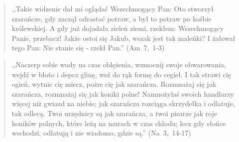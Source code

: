 \documentclass[10pt,a4paper,oneside]{article}
\begin{document}
\begin{quote}
,,Takie widzenie dał mi oglądać Wszechmogący Pan: Oto stworzył szarańcze, gdy zaczął odrastać potraw, a był to potraw po kośbie królewskiej. A gdy już dojadała zieleń ziemi, rzekłem: Wszechmogący Panie, przebacz! Jakże ostoi się Jakub, wszak jest tak maleńki? I żałował tego Pan: Nie stanie się - rzekł Pan.'' (Am~7,~1-3)
\end{quote}
\begin{quote}
,,Naczerp sobie wody na czas oblężenia, wzmocnij swoje obwarowania, wejdź w błoto i depcz glinę, weź do rąk formę do cegieł. I tak strawi cię ogień, wytnie cię miecz, pożre cię jak szarańcza. Rozmnażaj się jak szarańcza, rozmnażaj się jak koniki polne! Namnożyłaś swoich handlarzy więcej niż gwiazd na niebie; jak szarańcza rozciąga skrzydełka i odlatuje, tak odlecą. Twoi urzędnicy są jak szarańcza, a twoi pisarze jak roje koników polnych, które leżą na murach w czas chłodu; lecz gdy słońce wschodzi, odlatują i nie wiadomo, gdzie są.'' (Na~3,~14-17)
\end{quote}
\end{document}
